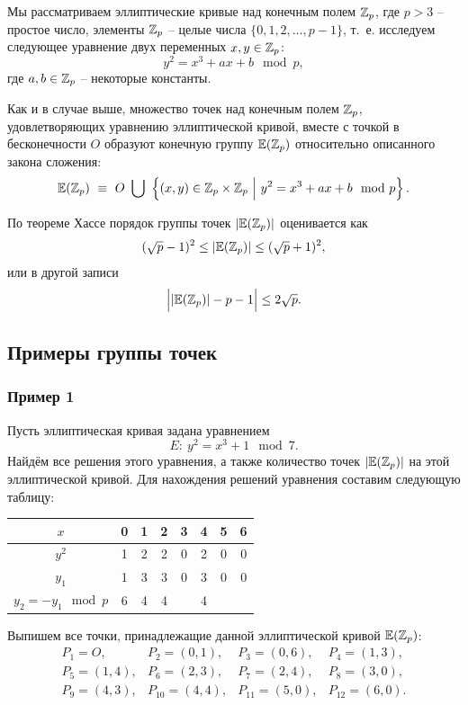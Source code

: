 Мы рассматриваем эллиптические кривые над конечным полем $\mathbb{Z}_p$, где $p > 3$ -- простое число, элементы $\mathbb{Z}_p$ -- целые числа $\{0, 1, 2,  \ldots, p-1\}$, т.~е. исследуем следующее уравнение двух переменных $x, y \in \mathbb{Z}_p$:
    \[ y^2 = x^3 + a x + b \mod p, \]
где $a, b \in \mathbb{Z}_p$ -- некоторые константы.

Как и в случае выше, множество точек над конечным полем $\mathbb{Z}_p$, удовлетворяющих уравнению эллиптической кривой, вместе с точкой в бесконечности $O$ образуют конечную группу $\mathbb{E}(\mathbb{Z}_p)$ относительно описанного закона сложения:
    \[ \mathbb{E}(\mathbb{Z}_p) ~ \equiv~  O ~ \bigcup ~
        \left\{ (x, y) \in \mathbb{Z}_p \times \mathbb{Z}_p ~\Big|~ y^2 = x^3 + a x + b \mod p \right\}. \]

По теореме Хассе порядок группы точек $|\mathbb{E}(\mathbb{Z}_p)|$ оценивается как
    \[ (\sqrt{p}-1)^2 \leq |\mathbb{E}(\mathbb{Z}_p)| \leq (\sqrt{p}+1)^2, \]
или в другой записи
    \[ \Big| |\mathbb{E}(\mathbb{Z}_p)| - p - 1 \Big| \le 2 \sqrt{p}. \]

\subsection{Примеры группы точек}

\subsubsection{Пример 1}

Пусть эллиптическая кривая задана уравнением
    \[ E: ~ y^2 = x^3 + 1 \mod 7. \]
Найдём все решения этого уравнения, а также количество точек $|\mathbb{E}(\mathbb{Z}_p)|$ на этой эллиптической кривой. Для нахождения решений уравнения составим следующую таблицу:

\begin{center} \begin{tabular}{|c|c|c|c|c|c|c|c|}
    \hline
    $x$ & 0 & 1 & 2 & 3 & 4 & 5 & 6 \\
    \hline
    $y^2$ & 1 & 2 & 2 & 0 & 2 & 0 & 0 \\
    \hline
    $y_1$ & 1 & 3 & 3 & 0 & 3 & 0 & 0 \\
    \hline
    $y_2 = - y_1 \mod p$ & 6 & 4 & 4 &   & 4 &   &   \\
    \hline
\end{tabular} \end{center}

Выпишем все точки, принадлежащие данной эллиптической кривой $\mathbb{E}(\mathbb{Z}_p)$:
\[
    \begin{array}{cccc}
        P_1 = O, & P_2 = (0,1), & P_3 = (0,6), & P_4 = (1,3), \\
        P_5 = (1,4), & P_6 = (2,3), & P_7 = (2,4), & P_8 = (3,0), \\
        P_9 = (4,3), & P_{10} = (4,4), & P_{11} = (5,0), & P_{12} = (6,0). \\
    \end{array}
\]


